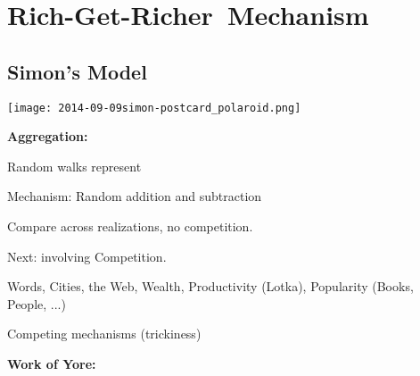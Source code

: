 


%
%




\section{Rich-Get-Richer\ Mechanism}

\subsection{Simon's Model}

  \texttt{[image: 2014-09-09simon-postcard\_polaroid.png]}

  \textbf{Aggregation:}
  
  
    
     
      Random walks represent 
     
      Mechanism: Random addition and subtraction
     
      Compare across realizations, no competition.
     
      Next: 
      involving Competition.
     
       Words, Cities, the Web, Wealth, Productivity (Lotka), Popularity (Books, People, ...) 
     
      Competing mechanisms (trickiness)
    
  



  \textbf{Work of Yore:}

